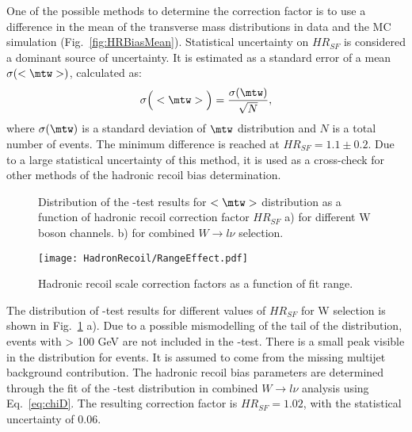 One of the possible methods to determine the correction factor is to use a difference in the mean of the transverse mass distributions in data and the MC simulation (Fig.~\ref{fig:HRBiasMean}). Statistical uncertainty on $HR_{SF}$ is considered  a dominant source of uncertainty. It is estimated as a standard error of a mean $\sigma ( <\mtw> ) $, calculated as:
\begin{equation}\label{eq:MeanErr}
\sigma \Big( <\mtw> \Big) = \frac{\sigma( \mtw )}{\sqrt N},
\end{equation}
where $\sigma(\mtw)$ is a standard deviation of $\mtw$ distribution and $N$ is a total number of events. The minimum difference is reached at $HR_{SF}=1.1\pm0.2$. Due to a large statistical uncertainty of this method, it is used as a cross-check for other methods of the hadronic recoil bias determination.

\begin{figure}[!tbp]
\begin{minipage}[h]{0.49\linewidth}
\end{minipage}
\hfill
\begin{minipage}[h]{0.49\linewidth}
\end{minipage}
\caption{Distribution of the \chiD-test results  for $<\mtw>$ distribution as a function of hadronic recoil correction factor $HR_{SF}$ a) for different W boson channels. 
b) for combined $W \to l \nu$ selection.}
\label{mtWChi2}
\end{figure}

\begin{figure}[!tbp]
\centering
\texttt{[image: HadronRecoil/RangeEffect.pdf]}
\caption{Hadronic recoil scale correction factors as a function of \mtw fit range. }
\label{ScaleMtWRange}
\end{figure}

The distribution of \chiD-test results for different values of $HR_{SF}$ for W selection is shown in Fig.~\ref{mtWChi2} a). Due to a possible mismodelling of the tail of the \mtw distribution, events with \mtw > 100 GeV are not included in the \chiD-test. There is a small peak visible in the \chiD distribution for \wenu events. It is assumed to come from the missing multijet background contribution. The hadronic recoil bias parameters are determined through the fit of the \chiD-test distribution in combined $W\to l\nu$ analysis using Eq.~\ref{eq:chiD}. The resulting correction factor is $HR_{SF}=1.02$, with the statistical uncertainty of 0.06. 

